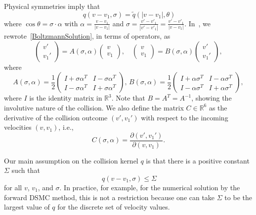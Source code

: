 \documentclass[12pt,nopreprintline]{elsarticle}
\newcommand{\bbR}{\mathbb R} \newcommand{\bbS}{\mathbb S}
\newcommand{\Rthree}{{\bbR^3}}
\begin{document}
Physical symmetries imply that
\begin{equation}~\label{eq:GeneralKernel}
    q(v-v_1,\sigma) =  \tilde q(|v-v_1|,\theta)
\end{equation}
where $\cos \theta = \sigma\cdot \alpha$ with $\alpha = \frac{v-v_1}{|v-v_1|}$ and $\sigma = \frac{v'-v'_1}{|v'-v'_1|} = \frac{v'-v'_1}{|v-v_1|}$. In~\cite{caflisch2021adjoint}, we rewrote~\eqref{BoltzmannSolution}, in terms of operators, as
\begin{equation}\label{eq:AB_vel_General}
        \begin{pmatrix}
    v'\\
   v_1'
    \end{pmatrix}    = A(\sigma,\alpha) \begin{pmatrix}
    v\\
    v_1
    \end{pmatrix}, \quad 
   \begin{pmatrix}
    v\\
     v_1
    \end{pmatrix}     = B(\sigma,\alpha)    \begin{pmatrix}
    v'\\
    v_1'
    \end{pmatrix},
\end{equation}
where
\begin{equation} \label{eq:AB_def}
A(\sigma ,\alpha )= \dfrac{1}{2}\begin{pmatrix}
    I+\sigma  \alpha ^T & I-\sigma  \alpha ^T\\
    I-\sigma  \alpha ^T & I+\sigma  \alpha ^T
    \end{pmatrix},\,B(\sigma ,\alpha )= \dfrac{1}{2}\begin{pmatrix}
    I+\alpha  \sigma ^T & I-\alpha  \sigma ^T\\
    I-\alpha  \sigma ^T & I+\alpha  \sigma ^T
    \end{pmatrix},
\end{equation}
where $I$ is the identity matrix in $\Rthree$. Note that $B= A^T = A^{-1}$, showing the involutive nature of the collision. We also define the matrix $C\in\mathbb{R}^6$ as the derivative of the collision outcome $(v',v_1')$ with respect to the incoming velocities $(v,v_1)$, i.e.,
\begin{equation}\label{eq:C_def}
C(\sigma,\alpha) = \dfrac{\partial (v',v_1')}{\partial (v,v_1)}.
\end{equation}


Our main assumption on the collision kernel $q$ is that there is a positive constant $\Sigma$ such that
\begin{equation}~\label{eq:UpperBound}
    q(v-v_1,\sigma) \leq \Sigma
\end{equation}
for all  $v$, $v_1$, and $\sigma$. In practice, for example, for the numerical solution by the forward DSMC method, this is not a restriction because one can take $\Sigma$ to be the largest value of $q$ for the discrete set of velocity values.
\end{document}
